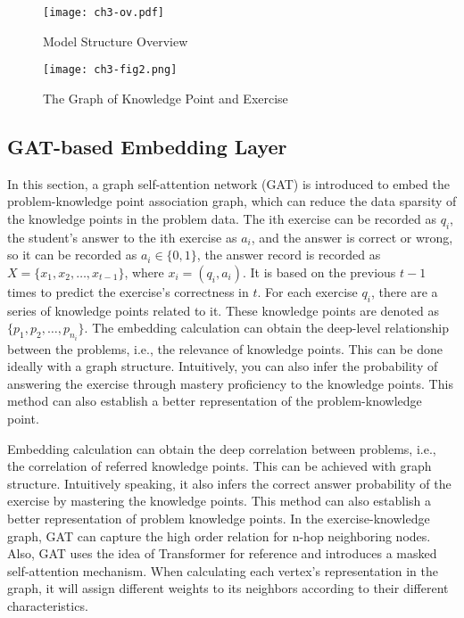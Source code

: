 \begin{figure}[htbp!]
	\centering
	\texttt{[image: ch3-ov.pdf]}
	\caption{Model Structure Overview}\label{fig:ch3-fig1}
\end{figure}
\begin{figure}[htbp!]
	\centering
	\texttt{[image: ch3-fig2.png]}
	\caption{The Graph of Knowledge Point and Exercise}\label{fig:ch3-fig2}
\end{figure}


\subsection{GAT-based Embedding Layer}

In this section, a graph self-attention network (GAT) is introduced to embed the problem-knowledge point association graph, which can reduce the data sparsity of the knowledge points in the problem data. The ith exercise can be recorded as \(q_i\), the student's answer to the ith exercise as \(a_i\), and the answer is correct or wrong, so it can be recorded as \(a_i\in \{0,1\} \), the answer record is recorded as \(X=\{x_1,x_2,\ldots,x_{t-1}\} \), where \(x_i=(q_i,a_i)\). It is based on the previous \(t-1\) times to predict the exercise's correctness in \(t\). For each exercise \(q_i\), there are a series of knowledge points related to it. These knowledge points are denoted as \( \{p_1,p_2,\ldots,p_{n_i}\} \). The embedding calculation can obtain the deep-level relationship between the problems, i.e., the relevance of knowledge points. This can be done ideally with a graph structure. Intuitively, you can also infer the probability of answering the exercise through mastery proficiency to the knowledge points. This method can also establish a better representation of the problem-knowledge point.

Embedding calculation can obtain the deep correlation between problems, i.e., the correlation of referred knowledge points. This can be achieved with graph structure. Intuitively speaking, it also infers the correct answer probability of the exercise by mastering the knowledge points. This method can also establish a better representation of problem knowledge points. In the exercise-knowledge graph, GAT can capture the high order relation for n-hop neighboring nodes. Also, GAT uses the idea of Transformer for reference and introduces a masked self-attention mechanism. When calculating each vertex's representation in the graph, it will assign different weights to its neighbors according to their different characteristics.

